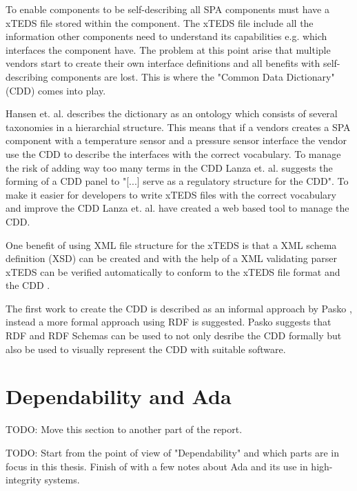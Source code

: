
To enable components to be self-describing all SPA components must have a xTEDS
file stored within the component. The xTEDS file include all the information
other components need to understand its capabilities e.g. which interfaces the
component have. The problem at this point arise that multiple vendors start to
create their own interface definitions and all benefits with self-describing
components are lost. This is where the "Common Data Dictionary" (CDD) comes
into play.

Hansen et. al.  \cite{hansen2012} describes the dictionary as an ontology which
consists of several taxonomies in a hierarchial structure. This means that if a
vendors creates a SPA component with a temperature sensor and a pressure sensor
interface the vendor use the CDD to describe the interfaces with the correct
vocabulary. To manage the risk of adding way too many terms in the CDD Lanza
et. al. \cite{lanza2010} suggests the forming of a CDD panel to "[...] serve as
a regulatory structure for the CDD". To make it easier for developers to write
xTEDS files with the correct vocabulary and improve the CDD Lanza et. al.
\cite{lanza2010} have created a web based tool to manage the CDD.

One benefit of using XML file structure for the xTEDS is that a XML schema
definition (XSD) can be created and with the help of a XML validating parser
xTEDS can be verified automatically to conform to the xTEDS file format and the
CDD \cite{lanza2010}.

The first work to create the CDD is described as an informal approach by Pasko
\cite{pasko2011}, instead a more formal approach using RDF is suggested. Pasko
suggests that RDF and RDF Schemas can be used to not only desribe the CDD
formally but also be used to visually represent the CDD with suitable software.


\section{Dependability and Ada}
TODO: Move this section to another part of the report.

TODO: Start from the point of view of "Dependability" and which parts are in
focus in this thesis. Finish of with a few notes about Ada and its use in
high-integrity systems.

